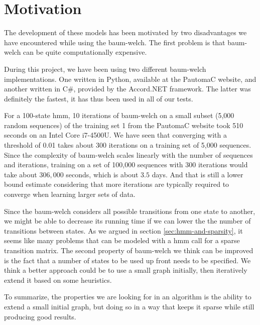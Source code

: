 \section{Motivation}
The development of these models has been motivated by two disadvantages we have encountered while using the \gls{baum-welch}.
The first problem is that \gls{baum-welch} can be quite computationally expensive.

During this project, we have been using two different \gls{baum-welch} implementations. One written in Python, available at the PautomaC website, and another written in C\#, provided by the Accord.NET framework. The latter was definitely the fastest, it has thus been used in all of our tests.

For a 100-state \gls{hmm}, 10 iterations of \gls{baum-welch} on a small subset (5,000 random sequences) of the training set 1 from the PautomaC website took 510 seconds on an Intel Core i7-4500U. We have seen that converging with a threshold of 0.01 takes about 300 iterations on a training set of 5,000 sequences. Since the complexity of \gls{baum-welch} scales linearly with the number of sequences and iterations, training on a set of 100,000 sequences with 300 iterations would take about $306,000$ seconds, which is about $3.5$ days. And that is still a lower bound estimate considering that more iterations are typically required to converge when learning larger sets of data.

Since the \gls{baum-welch} considers all possible transitions from one state to another, we might be able to decrease its running time if we can lower the the number of transitions between states. As we argued in section \ref{sec:hmm-and-sparsity}, it seems like many problems that can be modeled with a \gls{hmm} call for a sparse transition matrix.
The second property of \gls{baum-welch} we think can be improved is the fact that a number of states to be used up front needs to be specified.
We think a better approach could be to use a small graph initially, then iteratively extend it based on some heuristics.

To summarize, the properties we are looking for in an algorithm is the ability to extend a small initial graph, but doing so in a way that keeps it sparse while still producing good results.